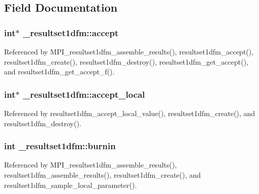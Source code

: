\subsection{Field Documentation}
\subsubsection[{\texorpdfstring{accept}{accept}}]{\setlength{\rightskip}{0pt plus 5cm}int$\ast$ \+\_\+resultset1dfm\+::accept}\hypertarget{struct__resultset1dfm_a7afcfc316c2b6634844c1467b1417b97}{}\label{struct__resultset1dfm_a7afcfc316c2b6634844c1467b1417b97}


Referenced by M\+P\+I\+\_\+resultset1dfm\+\_\+assemble\+\_\+results(), resultset1dfm\+\_\+accept(), resultset1dfm\+\_\+create(), resultset1dfm\+\_\+destroy(), resultset1dfm\+\_\+get\+\_\+accept(), and resultset1dfm\+\_\+get\+\_\+accept\+\_\+f().

\subsubsection[{\texorpdfstring{accept\+\_\+local}{accept_local}}]{\setlength{\rightskip}{0pt plus 5cm}int$\ast$ \+\_\+resultset1dfm\+::accept\+\_\+local}\hypertarget{struct__resultset1dfm_ae4760c6b41373090251048f441c602f7}{}\label{struct__resultset1dfm_ae4760c6b41373090251048f441c602f7}


Referenced by resultset1dfm\+\_\+accept\+\_\+local\+\_\+value(), resultset1dfm\+\_\+create(), and resultset1dfm\+\_\+destroy().

\subsubsection[{\texorpdfstring{burnin}{burnin}}]{\setlength{\rightskip}{0pt plus 5cm}int \+\_\+resultset1dfm\+::burnin}\hypertarget{struct__resultset1dfm_ac508f47e9939e53ba04095f440f3cc40}{}\label{struct__resultset1dfm_ac508f47e9939e53ba04095f440f3cc40}


Referenced by M\+P\+I\+\_\+resultset1dfm\+\_\+assemble\+\_\+results(), resultset1dfm\+\_\+assemble\+\_\+results(), resultset1dfm\+\_\+create(), and resultset1dfm\+\_\+sample\+\_\+local\+\_\+parameter().

